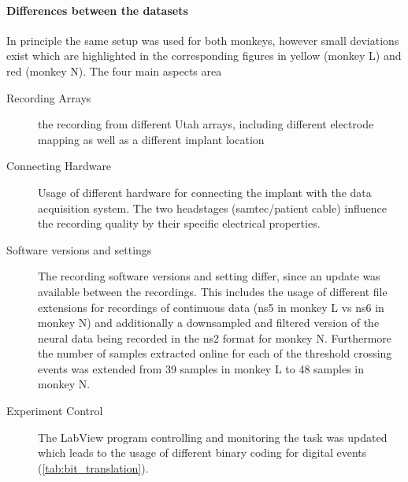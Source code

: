 \paragraph{Differences between the datasets}
In principle the same setup was used for both monkeys, however small deviations exist which are highlighted in the corresponding figures in yellow (monkey L) and red (monkey N). The four main aspects area
\begin{description}
 \item[Recording Arrays] the recording from different Utah arrays, including different electrode mapping as well as a different implant location
 \item[Connecting Hardware] Usage of different hardware for connecting the implant with the data acquisition system. The two headstages (samtec/patient cable) influence the recording quality by their specific electrical properties.
 \item[Software versions and settings] The recording software versions and setting differ, since an update was available between the recordings. This includes the usage of different file extensions for recordings of continuous data (ns5 in monkey L vs ns6 in monkey N) and additionally a downsampled and filtered version of the neural data being recorded in the ns2 format for monkey N. Furthermore the number of samples extracted online for each of the threshold crossing events was extended from 39 samples in monkey L to 48 samples in monkey N.
 \item[Experiment Control] The LabView program controlling and monitoring the task was updated which leads to the usage of different binary coding for digital events (\cref{tab:bit_translation}). 
\end{description}


